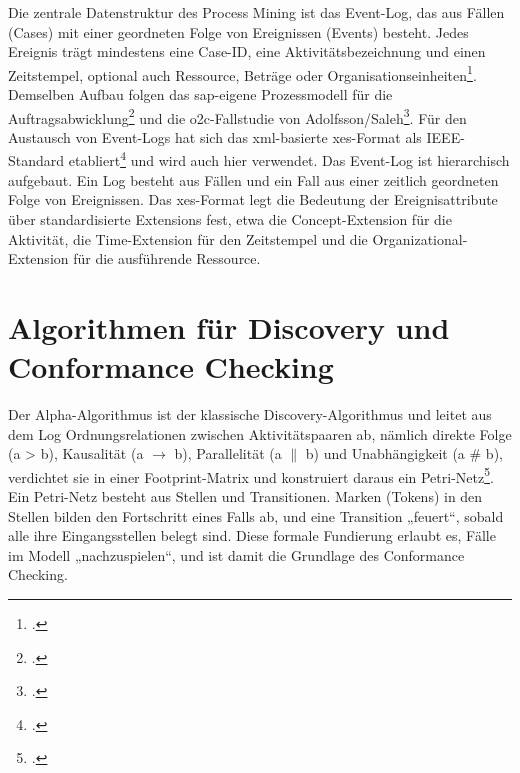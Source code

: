 Die zentrale Datenstruktur des Process Mining ist das Event-Log, das aus Fällen (Cases) mit einer geordneten Folge von Ereignissen (Events) besteht. Jedes Ereignis trägt mindestens eine Case-ID, eine Aktivitätsbezeichnung und einen Zeitstempel, optional auch Ressource, Beträge oder Organisationseinheiten\footcite[Vgl.][S.~125 ff.]{vanderaalst2016processmining}. Demselben Aufbau folgen das \gls{sap}-eigene Prozessmodell für die Auftragsabwicklung\footcite[Vgl.][Abschnitt~3.3, S.~22--26]{sap2022samplecontent} und die \gls{o2c}-Fallstudie von Adolfsson/Saleh\footcite[Vgl.][S.~13]{adolfsson2026o2c}. Für den Austausch von Event-Logs hat sich das \gls{xml}-basierte \gls{xes}-Format als IEEE-Standard etabliert\footcite[Vgl.][]{ieee2016xes} und wird auch hier verwendet. Das Event-Log ist hierarchisch aufgebaut. Ein Log besteht aus Fällen und ein Fall aus einer zeitlich geordneten Folge von Ereignissen. Das \gls{xes}-Format legt die Bedeutung der Ereignisattribute über standardisierte Extensions fest, etwa die Concept-Extension für die Aktivität, die Time-Extension für den Zeitstempel und die Organizational-Extension für die ausführende Ressource.
\par

\section{Algorithmen für Discovery und Conformance Checking}\label{sec:algorithmen}

Der Alpha-Algorithmus ist der klassische Discovery-Algorithmus und leitet aus dem Log Ordnungsrelationen zwischen Aktivitätspaaren ab, nämlich direkte Folge (a \textgreater{} b), Kausalität (a $\rightarrow$ b), Parallelität (a $\parallel$ b) und Unabhängigkeit (a \# b), verdichtet sie in einer Footprint-Matrix und konstruiert daraus ein Petri-Netz\footcites(Vgl.)()[S.~1128 ff.]{vanderaalst2004workflow}[S.~167 ff.]{vanderaalst2016processmining}. Ein Petri-Netz besteht aus Stellen und Transitionen. Marken (Tokens) in den Stellen bilden den Fortschritt eines Falls ab, und eine Transition „feuert“, sobald alle ihre Eingangsstellen belegt sind. Diese formale Fundierung erlaubt es, Fälle im Modell „nachzuspielen“, und ist damit die Grundlage des Conformance Checking.


